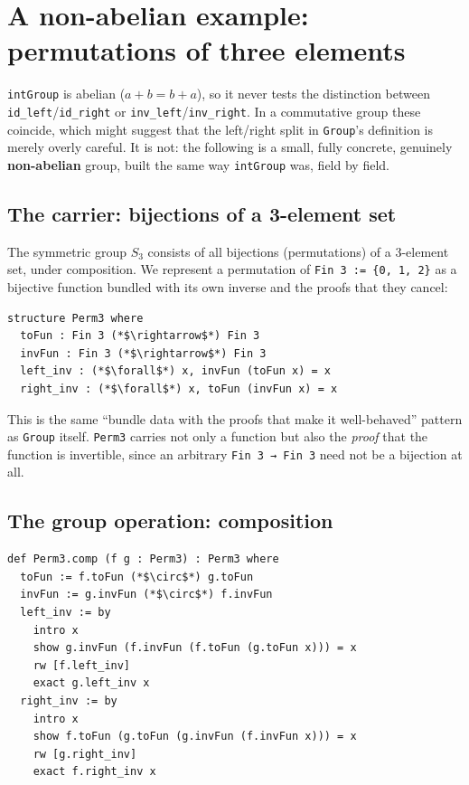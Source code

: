 \section{A non-abelian example: permutations of three elements}\label{sec:06-groups:04-permutations-example:1}

\texttt{intGroup} is abelian (\(a + b = b + a\)), so it never tests the distinction between \texttt{id\_\allowbreak{}left}/\texttt{id\_\allowbreak{}right} or \texttt{inv\_\allowbreak{}left}/\texttt{inv\_\allowbreak{}right}. In a commutative group these coincide, which might suggest that the left/right split in \texttt{Group}'s definition is merely overly careful. It is not: the following is a small, fully concrete, genuinely \textbf{non-abelian} group, built the same way \texttt{intGroup} was, field by field.

\subsection{The carrier: bijections of a 3-element set}\label{sec:06-groups:04-permutations-example:2}

The symmetric group \(S_3\) consists of all bijections (permutations) of a 3-element set, under composition. We represent a permutation of \texttt{Fin 3 := \{0, 1, 2\}} as a bijective function bundled with its own inverse and the proofs that they cancel:

\begin{lstlisting}
structure Perm3 where
  toFun : Fin 3 (*$\rightarrow$*) Fin 3
  invFun : Fin 3 (*$\rightarrow$*) Fin 3
  left_inv : (*$\forall$*) x, invFun (toFun x) = x
  right_inv : (*$\forall$*) x, toFun (invFun x) = x
\end{lstlisting}

This is the same ``bundle data with the proofs that make it well-behaved'' pattern as \texttt{Group} itself. \texttt{Perm3} carries not only a function but also the \emph{proof} that the function is invertible, since an arbitrary \texttt{Fin 3 → Fin 3} need not be a bijection at all.

\subsection{The group operation: composition}\label{sec:06-groups:04-permutations-example:3}

\begin{lstlisting}
def Perm3.comp (f g : Perm3) : Perm3 where
  toFun := f.toFun (*$\circ$*) g.toFun
  invFun := g.invFun (*$\circ$*) f.invFun
  left_inv := by
    intro x
    show g.invFun (f.invFun (f.toFun (g.toFun x))) = x
    rw [f.left_inv]
    exact g.left_inv x
  right_inv := by
    intro x
    show f.toFun (g.toFun (g.invFun (f.invFun x))) = x
    rw [g.right_inv]
    exact f.right_inv x
\end{lstlisting}

